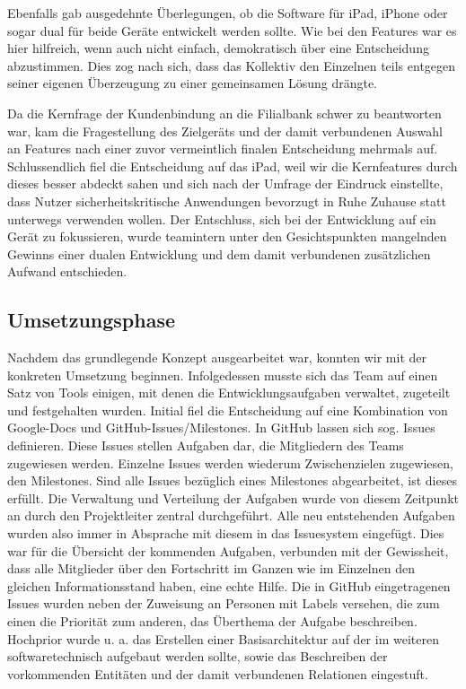 	Ebenfalls gab ausgedehnte Überlegungen, ob die Software für iPad, iPhone oder sogar dual für beide Geräte entwickelt werden sollte. Wie bei den Features war es hier hilfreich, wenn auch nicht einfach, demokratisch über eine Entscheidung abzustimmen. Dies zog nach sich, dass das Kollektiv den Einzelnen teils entgegen seiner eigenen Überzeugung zu einer gemeinsamen Lösung drängte. 
	
	Da die Kernfrage der Kundenbindung an die Filialbank schwer zu beantworten war, kam die Fragestellung des Zielgeräts und der damit verbundenen Auswahl an Features nach einer zuvor vermeintlich finalen Entscheidung mehrmals auf. Schlussendlich fiel die Entscheidung auf das iPad, weil wir die Kernfeatures durch dieses besser abdeckt sahen und sich nach der Umfrage der Eindruck einstellte, dass Nutzer sicherheitskritische Anwendungen bevorzugt in Ruhe Zuhause statt unterwegs verwenden wollen. Der Entschluss, sich bei der Entwicklung auf ein Gerät zu fokussieren, wurde teamintern unter den Gesichtspunkten mangelnden Gewinns einer dualen Entwicklung und dem damit verbundenen zusätzlichen Aufwand entschieden.

\subsection{Umsetzungsphase}
	Nachdem das grundlegende Konzept ausgearbeitet war, konnten wir mit der konkreten Umsetzung beginnen. Infolgedessen musste sich das Team auf einen Satz von Tools einigen, mit denen die Entwicklungsaufgaben verwaltet, zugeteilt und festgehalten wurden. Initial fiel die Entscheidung auf eine Kombination von Google-Docs und GitHub-Issues/Milestones. In GitHub lassen sich sog. Issues definieren. Diese Issues stellen Aufgaben dar, die Mitgliedern des Teams zugewiesen werden. Einzelne Issues werden wiederum Zwischenzielen zugewiesen, den Milestones. Sind alle Issues bezüglich eines Milestones abgearbeitet, ist dieses erfüllt. Die Verwaltung und Verteilung der Aufgaben wurde von diesem Zeitpunkt an durch den Projektleiter zentral durchgeführt. Alle neu entstehenden Aufgaben wurden also immer in Absprache mit diesem in das Issuesystem eingefügt. Dies war für die Übersicht der kommenden Aufgaben, verbunden mit der Gewissheit, dass alle Mitglieder über den Fortschritt im Ganzen wie im Einzelnen den gleichen Informationsstand haben, eine echte Hilfe. Die in GitHub eingetragenen Issues wurden neben der Zuweisung an Personen mit Labels versehen, die zum einen die Priorität zum anderen, das Überthema der Aufgabe beschreiben. Hochprior wurde u. a. das Erstellen einer Basisarchitektur auf der im weiteren softwaretechnisch aufgebaut werden sollte, sowie das Beschreiben der vorkommenden Entitäten und der damit verbundenen Relationen eingestuft. 

